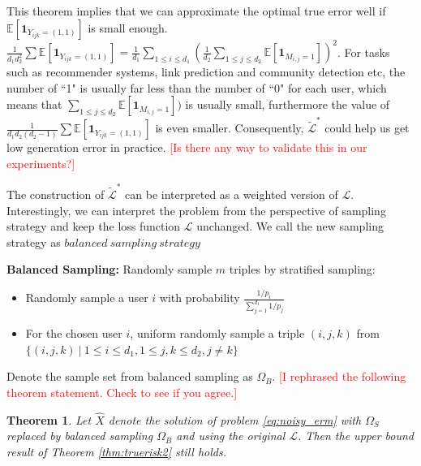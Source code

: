 \documentclass[conference]{IEEEtran}
\numberwithin{equation}{section}
\newcommand{\LL}[1]{\textcolor{red}{[#1]}}
\newtheorem{theorem}{Theorem}
\newtheorem{sampling strategy}{Sampling Strategy}
\begin{document}
This theorem implies that we can approximate the optimal true error well if $\mathbb{E}[\bm{1}_{Y_{ijk} = (1,1)}]$ is small enough. $\frac{1}{d_1d_2^2} \sum \mathbb{E}[ \bm{1}_{Y_{ijk} = (1,1)} ] = \frac{1}{d_1} \underset{1 \leq i \leq d_1}{\sum} (\frac{1}{d_2} \underset{1 \leq j \leq d_2}{\sum} \mathbb{E}[\bm{1}_{M_{i,j} = 1}] )^2$. For tasks such as recommender systems, link prediction and community detection etc, the number of ``1" is usually far less than the number of ``0" for each user, which means that $\underset{1 \leq j \leq d_2}{\sum} \mathbb{E}[\bm{1}_{M_{i,j} = 1}] )$ is usually small, furthermore the value of $\frac{1}{d_1d_2(d_2-1)} \sum \mathbb{E}[ \bm{1}_{Y_{ijk} = (1,1)} ]$ is even smaller. Consequently, $\tilde{\mathcal{L}}^*$ could help us get low generation error in practice. \LL{Is there any way to validate this in our experiments?} 

The construction of $\tilde{\mathcal{L}}^*$ can be interpreted as a weighted version of $\mathcal{L}$. Interestingly, we can interpret the problem from the perspective of sampling strategy and keep the loss function $\mathcal{L}$ unchanged. We call the new sampling strategy as $balanced~sampling~strategy$

\textbf{Balanced Sampling:} Randomly sample $m$ triples by stratified sampling:
\begin{itemize}
    \item Randomly sample a user $i$ with probability $\frac{1/p_i}{\sum_{j=1}^{d_1} 1/p_j}$
    \item For the chosen user $i$, uniform randomly sample a triple $(i,j,k)$ from $\{(i,j,k)~|~ 1\leq i \leq d_1, 1\leq j,k\leq d_2, j\neq k\}$
\end{itemize}
Denote the sample set from balanced sampling as $\Omega_B$.
\LL{I rephrased the following theorem statement. Check to see if you agree.}

\begin{theorem}
 Let $\hat{X}$ denote the solution of problem \ref{eq:noisy_erm} with $\Omega_S$ replaced by   balanced sampling $\Omega_B$ and using the original $\mathcal{L}$. Then the upper bound result of Theorem \ref{thm:truerisk2} still holds. %
\label{thm:bsample}
\end{theorem}
\end{document}
